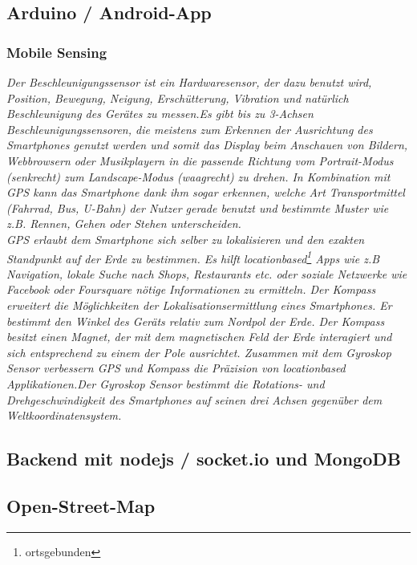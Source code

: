 \subsection{Arduino / Android-App}
\subsubsection{Mobile Sensing}
\textit{Der Beschleunigungssensor ist ein Hardwaresensor, der dazu benutzt wird, Position, Bewegung, Neigung, Erschütterung, Vibration und natürlich Beschleunigung des Gerätes zu messen.Es gibt bis zu 3-Achsen Beschleunigungssensoren, die meistens zum Erkennen der Ausrichtung des Smartphones genutzt werden und somit das Display beim Anschauen von Bildern, Webbrowsern oder Musikplayern in die passende Richtung vom Portrait-Modus (senkrecht) zum Landscape-Modus (waagrecht) zu drehen. In Kombination mit \gls{GPS} kann das Smartphone dank ihm sogar erkennen, welche Art Transportmittel (Fahrrad, Bus, U-Bahn) der Nutzer gerade benutzt und bestimmte Muster wie z.B. Rennen, Gehen oder Stehen unterscheiden.\\
\gls{GPS} erlaubt dem Smartphone sich selber zu lokalisieren und den exakten Standpunkt auf der Erde zu bestimmen. Es hilft locationbased\footnote{ortsgebunden} Apps wie z.B Navigation, lokale Suche nach Shops, Restaurants etc. oder soziale Netzwerke wie Facebook oder Foursquare nötige Informationen zu ermitteln. Der Kompass erweitert die Möglichkeiten der Lokalisationsermittlung eines Smartphones. Er bestimmt den Winkel des Geräts relativ zum Nordpol der Erde. Der Kompass besitzt einen Magnet, der mit dem magnetischen Feld der Erde interagiert und sich entsprechend zu einem der Pole ausrichtet. Zusammen mit dem Gyroskop Sensor verbessern \gls{GPS} und Kompass die Präzision von locationbased Applikationen.Der Gyroskop Sensor bestimmt die Rotations- und Drehgeschwindigkeit des Smartphones auf seinen drei Achsen gegenüber dem Weltkoordinatensystem.}
\subsection{Backend mit nodejs / socket.io und MongoDB}
\subsection{Open-Street-Map}

